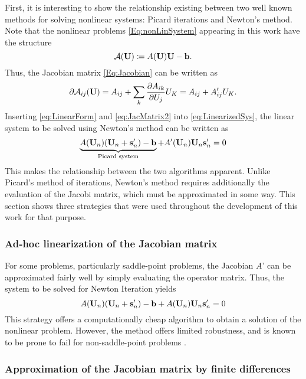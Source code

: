 First, it is interesting to show the relationship existing between two well known methods for solving nonlinear systems: Picard iterations and Newton's method. Note that the nonlinear problems \cref{Eq:nonLinSystem} appearing in this work have the structure
\begin{equation}
	\mathcal{A}(\textbf{U}) \coloneqq  A(\textbf{U})\textbf{U}-\textbf{b}. \label{eq:LinearForm}
\end{equation}
Thus, the Jacobian matrix \cref{Eq:Jacobian} can be written as
\begin{equation}
	\partial \mathcal{A}_{ij}(\textbf{U})  = A_{ij} + \sum_k \frac{\partial A_{ik}}{\partial U_j} U_K = A_{ij} + A'_{ij}U_K.\label{eq:JacMatrix2}
\end{equation}
Inserting \cref{eq:LinearForm} and  \cref{eq:JacMatrix2} into \cref{eq:LinearizedSys}, the linear system to be solved using Newton's method can be written as
\begin{equation}
	\underbrace{A(\textbf{U}_n)(\textbf{U}_n+\textbf{s}'_n) - \textbf{b}}_{\text{Picard system}} + A'(\textbf{U}_n)\textbf{U}_n\textbf{s}'_n = 0
\end{equation}
This makes the relationship between the two algorithms apparent. Unlike Picard's method of iterations, Newton's method requires additionally the evaluation of the Jacobi matrix, which must be approximated in some way. This section shows three strategies that were used throughout the development of this work for that purpose.

\subsubsection{Ad-hoc linearization of the Jacobian matrix}
For some problems, particularly saddle-point problems, the Jacobian $A$' can be approximated fairly well by simply evaluating the operator matrix. Thus, the system to be solved for Newton Iteration yields
\begin{equation}
	A(\textbf{U}_n)(\textbf{U}_n+\textbf{s}'_n) - \textbf{b} + A(\textbf{U}_n)\textbf{U}_n\textbf{s}'_n = 0
\end{equation}
This strategy offers a computationally cheap algorithm to obtain a solution of the nonlinear problem. However, the method offers limited robustness, and is known to be prone to fail for non-saddle-point problems \parencite{kikkerHighOrderEXtendedDiscontinuous2020}. 

\subsubsection{Approximation of the Jacobian matrix by finite differences}

